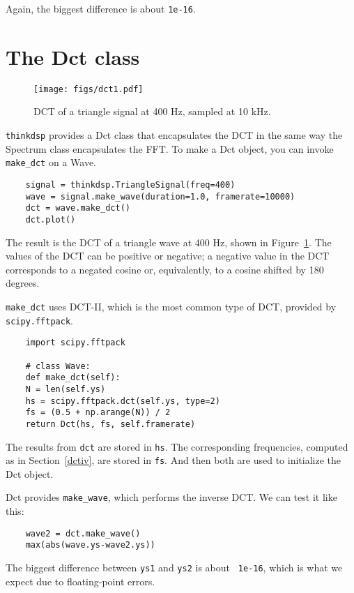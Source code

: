 Again, the biggest difference is about {\tt 1e-16}.


\section{The Dct class}

\begin{figure}
	\centerline{\texttt{[image: figs/dct1.pdf]}}
	\caption{DCT of a triangle signal at 400 Hz, sampled at 10 kHz.}
	\label{fig.dct1}
\end{figure}

{\tt thinkdsp} provides a Dct class that encapsulates the
DCT in the same way the Spectrum class encapsulates the FFT.
To make a Dct object, you can invoke \verb"make_dct" on a Wave.

\begin{verbatim}
	signal = thinkdsp.TriangleSignal(freq=400)
	wave = signal.make_wave(duration=1.0, framerate=10000)
	dct = wave.make_dct()
	dct.plot()
\end{verbatim}

The result is the DCT of a triangle wave at 400 Hz, shown in
Figure~\ref{fig.dct1}.  The values of the DCT can be positive or negative;
a negative value in the DCT corresponds to a negated cosine or,
equivalently, to a cosine shifted by 180 degrees.

\verb"make_dct" uses DCT-II, which is the most common type of DCT,
provided by {\tt scipy.fftpack}.

\begin{verbatim}
	import scipy.fftpack
	
	# class Wave:
	def make_dct(self):
	N = len(self.ys)
	hs = scipy.fftpack.dct(self.ys, type=2)
	fs = (0.5 + np.arange(N)) / 2
	return Dct(hs, fs, self.framerate)
\end{verbatim}

The results from {\tt dct} are stored in {\tt hs}.  The corresponding
frequencies, computed as in Section~\ref{dctiv}, are stored in {\tt fs}.
And then both are used to initialize the Dct object.

Dct provides \verb"make_wave", which performs the inverse DCT.
We can test it like this:

\begin{verbatim}
	wave2 = dct.make_wave()
	max(abs(wave.ys-wave2.ys))
\end{verbatim}

The biggest difference between {\tt ys1} and {\tt ys2} is about {\tt
	1e-16}, which is what we expect due to floating-point errors.

